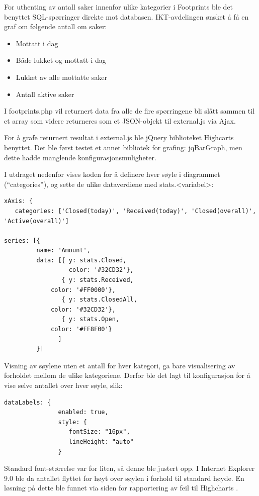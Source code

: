 For uthenting av antall saker innenfor ulike kategorier i Footprints ble det benyttet SQL-spørringer direkte mot databasen. IKT-avdelingen ønsket å få en graf om følgende antall om saker:
\begin{itemize}
	\item Mottatt i dag
	\item Både lukket og mottatt i dag
	\item Lukket av alle mottatte saker
	\item Antall aktive saker
\end{itemize}

I footprints.php vil returnert data fra alle de fire spørringene bli slått sammen til et array som videre returneres som et JSON-objekt til external.js via Ajax. 

For å grafe returnert resultat i external.js ble jQuery biblioteket Highcarts benyttet. Det ble først testet et annet bibliotek for grafing: jqBarGraph, men dette hadde manglende konfigurasjonsmuligheter.  

I utdraget nedenfor vises koden for å definere hver søyle i diagrammet (``categories''), og sette de ulike dataverdiene med stats.<variabel>:
\begin{lstlisting}[style=example]
xAxis: {
   categories: ['Closed(today)', 'Received(today)', 'Closed(overall)', 'Active(overall)']

series: [{
         name: 'Amount',
         data: [{ y: stats.Closed,
                  color: '#32CD32'},
                { y: stats.Received,
             color: '#FF0000'},
                { y: stats.ClosedAll,
             color: '#32CD32'},
                { y: stats.Open,
             color: '#FF8F00'}
               ]
         }]
\end{lstlisting}

Visning av søylene uten et antall for hver kategori, ga bare visualisering av forholdet mellom de ulike kategoriene. Derfor ble det lagt til konfigurasjon for å vise selve antallet over hver søyle, slik: 

\begin{lstlisting}
dataLabels: {
               enabled: true,
               style: {
                  fontSize: "16px",
                  lineHeight: "auto"
               }
\end{lstlisting}

Standard font-størrelse var for liten, så denne ble justert opp. I Internet Explorer 9.0 ble da antallet flyttet for høyt over søylen i forhold til standard høyde. En løsning på dette ble funnet via siden for rapportering av feil til Highcharts \cite{iebug}. 

